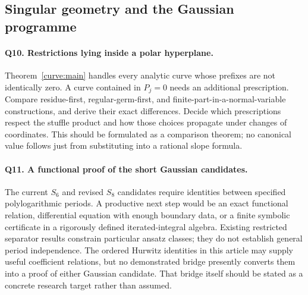 \subsection{Singular geometry and the Gaussian programme}

\paragraph{Q10. Restrictions lying inside a polar hyperplane.}
Theorem~\ref{curve:main} handles every analytic curve whose prefixes
are not identically zero. A curve contained in $P_j=0$ needs an
additional prescription. Compare residue-first, regular-germ-first,
and finite-part-in-a-normal-variable constructions, and derive their
exact differences. Decide which prescriptions respect the stuffle
product and how those choices propagate under changes of coordinates.
This should be formulated as a comparison theorem; no canonical
value follows just from substituting into a rational slope formula.

\paragraph{Q11. A functional proof of the short Gaussian candidates.}
The current $S_6$ and revised $S_8$ candidates require identities
between specified polylogarithmic periods. A productive next step
would be an exact functional relation, differential equation with
enough boundary data, or a finite symbolic certificate in a rigorously
defined iterated-integral algebra. Existing restricted separator
results constrain particular ansatz classes; they do not establish
general period independence. The ordered Hurwitz identities in this
article may supply useful coefficient relations, but no demonstrated
bridge presently converts them into a proof of either Gaussian
candidate. That bridge itself should be stated as a concrete research
target rather than assumed.
